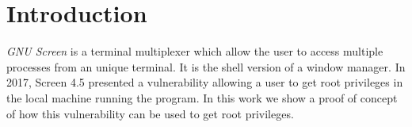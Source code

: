 \section{Introduction}
\emph{GNU Screen} is a terminal multiplexer which allow the user to access multiple processes from an unique terminal. It is the shell version of a window manager. In 2017, Screen 4.5 presented a vulnerability allowing a user to get root privileges in the local machine running the program. In this work we show a proof of concept of how this vulnerability can be used to get root privileges.
